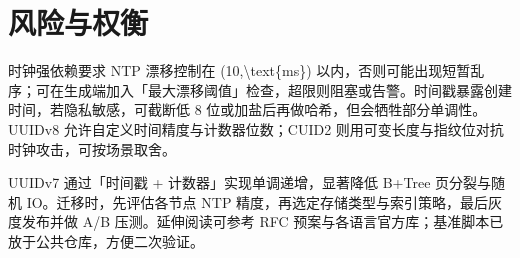 \chapter{风险与权衡}
时钟强依赖要求 NTP 漂移控制在 (10,\textbackslash{}text\{{}ms\}{}) 以内，否则可能出现短暂乱序；可在生成端加入「最大漂移阈值」检查，超限则阻塞或告警。时间戳暴露创建时间，若隐私敏感，可截断低 8 位或加盐后再做哈希，但会牺牲部分单调性。UUIDv8 允许自定义时间精度与计数器位数；CUID2 则用可变长度与指纹位对抗时钟攻击，可按场景取舍。\par
UUIDv7 通过「时间戳 + 计数器」实现单调递增，显著降低 B+Tree 页分裂与随机 IO。迁移时，先评估各节点 NTP 精度，再选定存储类型与索引策略，最后灰度发布并做 A/B 压测。延伸阅读可参考 RFC 预案与各语言官方库；基准脚本已放于公共仓库，方便二次验证。\par
